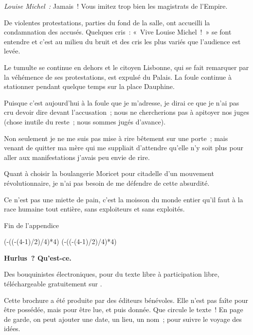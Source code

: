 \documentclass[french,twoside]{book} %
\def\mednobreak{\ifdim\lastskip<\medskipamount
  \removelastskip\nopagebreak\medskip\fi}
\newcommand{\labelblock}[1]{\medbreak{\noindent\color{rubric}\bfseries #1}\par\mednobreak}
\newcommand\chapterclose{} %
\def\truncdiv#1#2{((#1-(#2-1)/2)/#2)}
\def\moduloop#1#2{(#1-\truncdiv{#1}{#2}*#2)}
\def\modulo#1#2{\number\numexpr\moduloop{#1}{#2}\relax}
\begin{document}
\emph{Louise Michel :} Jamais ! Vous imitez trop bien les magistrats de l’Empire.\par
\bigbreak
\noindent De violentes protestations, parties du fond de la salle, ont accueilli la condamnation des accusés. Quelques cris : « Vive Louise Michel ! » se font entendre et c’est au milieu du bruit et des cris les plus variés que l’audience est levée.\par
Le tumulte se continue en dehors et le citoyen Lisbonne, qui se fait remarquer par la véhémence de ses protestations, est expulsé du Palais. La foule continue à stationner pendant quelque temps sur la place Dauphine.\par

\labelblock{Note}

\noindent Puisque c’est aujourd’hui à la foule que je m’adresse, je dirai ce que je n’ai pas cru devoir dire devant l’accusation ; nous ne chercherions pas à apitoyer nos juges (chose inutile du reste ; nous sommes jugés d’avance).\par
 Non seulement je ne me suis pas mise à rire bêtement sur une porte ; mais venant de quitter ma mère qui me suppliait d’attendre qu’elle n’y soit plus pour aller aux manifestations j’avais peu envie de rire.\par
Quant à choisir la boulangerie Moricet pour citadelle d’un mouvement révolutionnaire, je n’ai pas besoin de me défendre de cette absurdité.\par
Ce n’est pas une miette de pain, c’est la moisson du monde entier qu’il faut à la race humaine tout entière, sans exploiteurs et sans exploités.\par


\begin{raggedleft}Fin de l’appendice\end{raggedleft}
\chapterclose

\chapterclose

 


\ifbooklet
  \pagestyle{empty}
  \clearpage
  \ifnum\modulo{\value{page}}{4}=0 \hbox{}\newpage\hbox{}\newpage\fi
  \ifnum\modulo{\value{page}}{4}=1 \hbox{}\newpage\hbox{}\newpage\fi


  \hbox{}\newpage
  \ifodd\value{page}\hbox{}\newpage\fi
  {\centering\color{rubric}\bfseries\noindent\large
    Hurlus ? Qu’est-ce.\par
    \bigskip
  }
  \noindent Des bouquinistes électroniques, pour du texte libre à participation libre,
  téléchargeable gratuitement sur \href{https://hurlus.fr}{}.\par
  \bigskip
  \noindent Cette brochure a été produite par des éditeurs bénévoles.
  Elle n’est pas faîte pour être possédée, mais pour être lue, et puis donnée.
  Que circule le texte !
  En page de garde, on peut ajouter une date, un lieu, un nom ; pour suivre le voyage des idées.
  \par
\end{document}
